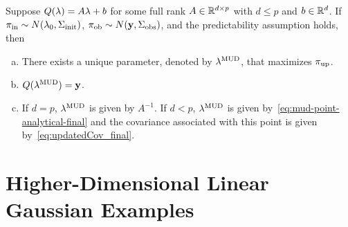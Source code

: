 \begin{thm}\label{thm:MUD_existence_uniqueness}
Suppose  $Q(\lambda)=A\lambda+b$ for some full rank $A\in\mathbb{R}^{d\times p}$ with $d\leq p$ and $b\in\mathbb{R}^d$.
If $\operatorname*{\pi_{in}} \sim N(\lambda_0,\Sigma_\text{init})$, $\operatorname*{\pi_{ob}}\sim N(\mathbf{y},\Sigma_\text{obs})$, and the predictability assumption holds, then
\begin{enumerate}[(a)]
\item There exists a unique parameter, denoted by $\lambda^{\text{MUD}}$, that maximizes $\operatorname*{\pi_{up}}$.
\item $Q(\lambda^{\text{MUD}}) = \mathbf{y}$.
\item If $d=p$, $\lambda^{\text{MUD}}$ is given by $A^{-1}$. If $d<p$, $\lambda^{\text{MUD}}$ is given by~\eqref{eq:mud-point-analytical-final} and the covariance associated with this point is given by~\eqref{eq:updatedCov_final}.
\end{enumerate}
\end{thm}




\section{Higher-Dimensional Linear Gaussian Examples}\label{sec:high-dim-linear-example}



